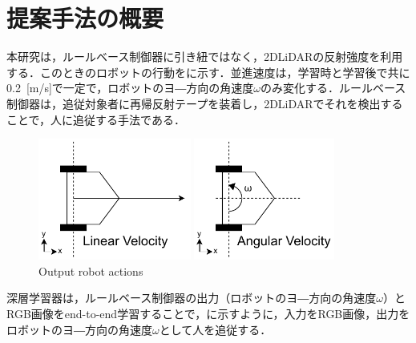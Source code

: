 
\section{提案手法の概要}

  本研究は，ルールベース制御器に引き紐ではなく，2DLiDARの反射強度を利用する．このときのロボットの行動をに示す．並進速度は，学習時と学習後で共に0.2 \,[m/s]で一定で，ロボットのヨ―方向の角速度$\omega$のみ変化する．ルールベース制御器は，追従対象者に再帰反射テープを装着し，2DLiDARでそれを検出することで，人に追従する手法である．

  \begin{figure}[h]
    \centering
    \begin{minipage}[c]{65mm} 
        \centering
        \includegraphics[height=40mm]{images/pdf/RobotGuidance_linear_velocity}
    \end{minipage}
    \begin{minipage}[c]{65mm} 
        \centering
        \includegraphics[height=40mm]{images/pdf/RobotGuidance_angular_velocity}
    \end{minipage}
    \caption{Output robot actions}
    \label{Fig:RobotGuidance_velocity}
  \end{figure}

\newpage

  深層学習器は，ルールベース制御器の出力（ロボットのヨ―方向の角速度$\omega$）とRGB画像をend-to-end学習することで，に示すように，入力をRGB画像，出力をロボットのヨ―方向の角速度$\omega$として人を追従する．

